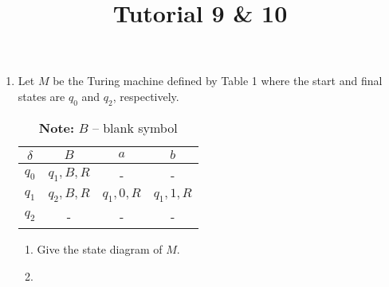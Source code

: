 \documentclass[a4paper, 12pt]{article}
\title{Tutorial 9 & 10}
\date{}
\author{}
\makeatletter
\renewenvironment{proof}[1][\proofname]{\par
  \normalfont \topsep6\p@\@plus6\p@\relax
  \trivlist
  \item[\hskip\labelsep
        \itshape
    #1\@addpunct{.}]\ignorespaces
}{%
  \endtrivlist\@endpefalse
}
\renewcommand{\proofname}{Solution:}
\makeatother
\begin{document}
    \begin{enumerate}
        \item Let $M$ be the Turing machine defined by Table 1 where the start and final states are $q_0$ and $q_2$, respectively.

        \begin{table}[ht]
            \centering
            \caption{}
            \begin{tabular}{|c|c|c|c|}
                \hline
                $\delta$ & $B$ & $a$ & $b$ \\ \hline
                $q_0$ & $q_1, B, R$ & - & - \\ \hline
                $q_1$ & $q_2, B, R$ & $q_1, 0, R$ & $q_1, 1, R$ \\ \hline
                $q_2$ & - & - & - \\
                \hline
            \end{tabular}
            \caption*{\small \textbf{Note:} $B$ -- blank symbol}
        \end{table}
        \begin{enumerate}
            \item Give the state diagram of $M$.
                \begin{proof}
                    \leavevmode
                    
                    \begin{center}
\end{center}
\end{proof}
\end{enumerate}
\end{enumerate}
\end{document}
